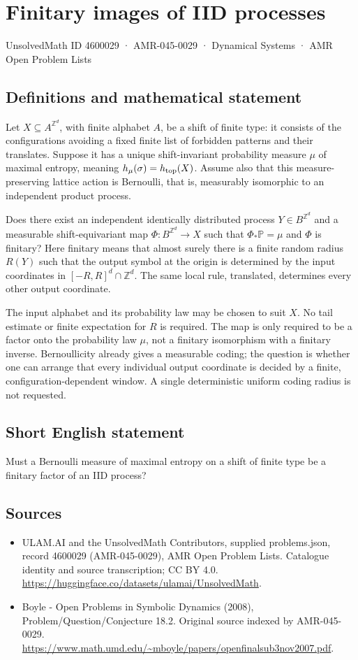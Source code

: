 \documentclass[11pt,a4paper]{article}
\begin{document}
\section*{Finitary images of IID processes}\label{4600029}
{\small UnsolvedMath ID 4600029 · AMR-045-0029 · Dynamical Systems · AMR Open Problem Lists}
\subsection{Definitions and mathematical statement}
Let $X\subseteq A^{\mathbb Z^d}$, with finite alphabet $A$, be a shift of
finite type: it consists of the configurations avoiding a fixed finite
list of forbidden patterns and their translates. Suppose it has a unique
shift-invariant probability measure $\mu$ of maximal entropy, meaning
$h_\mu(\sigma)=h_{\rm top}(X)$. Assume also that this measure-preserving
lattice action is Bernoulli, that is, measurably isomorphic to an
independent product process.

Does there exist an independent identically distributed process
$Y\in B^{\mathbb Z^d}$ and a measurable shift-equivariant map
$\Phi:B^{\mathbb Z^d}\to X$ such that $\Phi_*\mathbb P=\mu$ and
$\Phi$ is finitary? Here finitary means that almost surely there is a
finite random radius $R(Y)$ such that the output symbol at the origin
is determined by the input coordinates in $[-R,R]^d\cap\mathbb Z^d$.
The same local rule, translated, determines every other output coordinate.

The input alphabet and its probability law may be chosen to suit $X$.
No tail estimate or finite expectation for $R$ is required. The map is
only required to be a factor onto the probability law $\mu$, not a
finitary isomorphism with a finitary inverse. Bernoullicity already gives
a measurable coding; the question is whether one can arrange that every
individual output coordinate is decided by a finite, configuration-dependent
window. A single deterministic uniform coding radius is not requested.
\subsection{Short English statement}
Must a Bernoulli measure of maximal entropy on a shift of finite type be a finitary factor of an IID process?
\subsection{Sources}
\begin{itemize}
\item[S1] ULAM.AI and the UnsolvedMath Contributors, supplied problems.json, record 4600029 (AMR-045-0029), AMR Open Problem Lists. Catalogue identity and source transcription; CC BY 4.0.
\url{https://huggingface.co/datasets/ulamai/UnsolvedMath}.
\item[S2] Boyle - Open Problems in Symbolic Dynamics (2008), Problem/Question/Conjecture 18.2. Original source indexed by AMR-045-0029.
\url{https://www.math.umd.edu/~mboyle/papers/openfinalsub3nov2007.pdf}.
\end{itemize}
\end{document}
